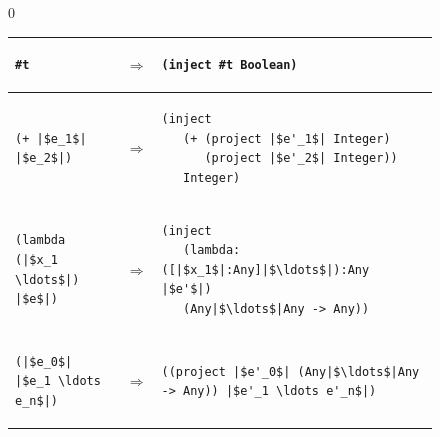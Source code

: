 \documentclass[7x10]{TimesAPriori_MIT}%
\def\racketEd{0}
\def\edition{0}
\numberwithin{theorem}{chapter}
\numberwithin{definition}{chapter}
\numberwithin{equation}{chapter}
\begin{document}
\begin{figure}[btp]
\centering
  \begin{tcolorbox}[colback=white]
{\if\edition\racketEd
\begin{tabular}{lll}
\begin{minipage}{0.27\textwidth}
\begin{lstlisting}
#t
\end{lstlisting}
\end{minipage}
&
$\Rightarrow$
&
\begin{minipage}{0.65\textwidth}
\begin{lstlisting}
(inject #t Boolean)
\end{lstlisting}
\end{minipage}
\\[2ex]\hline
\begin{minipage}{0.27\textwidth}
\begin{lstlisting}
(+ |$e_1$| |$e_2$|)
\end{lstlisting}
\end{minipage}
&
$\Rightarrow$
&
\begin{minipage}{0.65\textwidth}
\begin{lstlisting}
(inject
   (+ (project |$e'_1$| Integer)
      (project |$e'_2$| Integer))
   Integer)
\end{lstlisting}
\end{minipage}
\\[2ex]\hline
\begin{minipage}{0.27\textwidth}
\begin{lstlisting}
(lambda (|$x_1 \ldots$|) |$e$|)
\end{lstlisting}
\end{minipage}
&
$\Rightarrow$
&
\begin{minipage}{0.65\textwidth}
\begin{lstlisting}
(inject
   (lambda: ([|$x_1$|:Any]|$\ldots$|):Any |$e'$|)
   (Any|$\ldots$|Any -> Any))
\end{lstlisting}
\end{minipage}
\\[2ex]\hline
\begin{minipage}{0.27\textwidth}
\begin{lstlisting}
(|$e_0$| |$e_1 \ldots e_n$|)
\end{lstlisting}
\end{minipage}
&
$\Rightarrow$
&
\begin{minipage}{0.65\textwidth}
\begin{lstlisting}
((project |$e'_0$| (Any|$\ldots$|Any -> Any)) |$e'_1 \ldots e'_n$|)

\end{lstlisting}
\end{minipage}
\end{tabular}}
\end{tcolorbox}
\end{figure}
\end{document}
